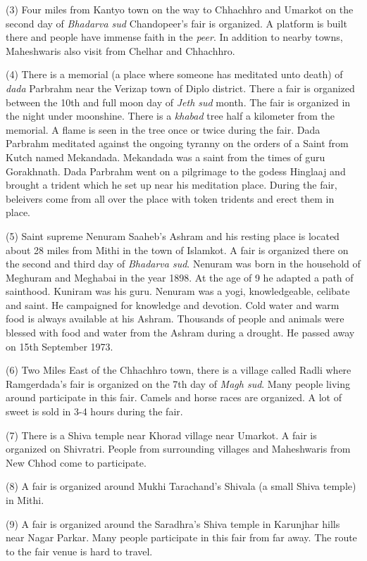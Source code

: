 (3) Four miles from Kantyo town on the way to Chhachhro and Umarkot on the
second day of \textit{Bhadarva sud} Chandopeer's fair is organized. A platform
is built there and people have immense faith in the \textit{peer}. In addition to nearby
towns, Maheshwaris also visit from Chelhar and Chhachhro.

(4) There is a memorial (a place where someone has meditated unto death) of
\textit{dada} Parbrahm near the Verizap town of Diplo district. There a fair is
organized between the 10th and full moon day of \textit{Jeth sud} month. The
fair is organized in the night under moonshine. There is a \textit{khabad} tree
half a kilometer from the memorial. A flame is seen in the tree once or twice
during the fair. Dada Parbrahm meditated against the ongoing tyranny on the
orders of a Saint from Kutch named Mekandada. Mekandada was a saint from the
times of guru Gorakhnath. Dada Parbrahm went on a pilgrimage to the godess
Hinglaaj and brought a trident which he set up near his meditation place.
During the fair, beleivers come from all over the place with token tridents and
erect them in place.

(5) Saint supreme Nenuram Saaheb's Ashram and his resting place is located
about 28 miles from Mithi in the town of Islamkot. A fair is organized there on
the second and third day of \textit{Bhadarva sud}. Nenuram was born in the
household of Meghuram and Meghabai in the year 1898. At the age of 9 he adapted
a path of sainthood. Kuniram was his guru. Nenuram was a yogi, knowledgeable,
celibate and saint. He campaigned for knowledge and devotion. Cold water and
warm food is always available at his Ashram. Thousands of people and animals
were blessed with food and water from the Ashram during a drought. He passed
away on 15th September 1973.

(6) Two Miles East of the Chhachhro town, there is a village called Radli where
Ramgerdada's fair is organized on the 7th day of \textit{Magh sud}. Many people
living around participate in this fair. Camels and horse races are organized. A
lot of sweet is sold in 3-4 hours during the fair.

(7) There is a Shiva temple near Khorad village near Umarkot. A fair is
organized on Shivratri. People from surrounding villages and Maheshwaris
from New Chhod come to participate.

(8) A fair is organized around Mukhi Tarachand's Shivala (a small Shiva temple)
in Mithi.

(9) A fair is organized around the Saradhra's Shiva temple in Karunjhar hills
near Nagar Parkar. Many people participate in this fair from far away. The
route to the fair venue is hard to travel. 

